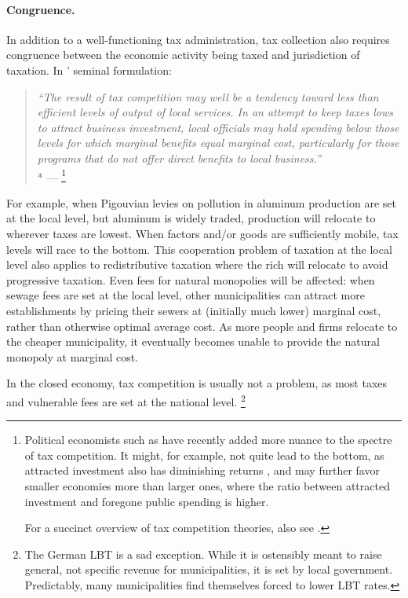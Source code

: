 \paragraph[Congruence]{Congruence.} In addition to a well-functioning tax administration, tax collection also requires congruence between the economic activity being taxed and jurisdiction of taxation.
In \citeauthor{Oates1972}' seminal formulation:
\begin{quote}
	\emph{``The result of tax competition may well be a tendency toward less than efficient levels of output of local services.
	In an attempt to keep taxes lows to attract business investment, local officials may hold spending below those levels for which marginal benefits equal marginal cost, particularly for those programs that do not offer direct benefits to local business.''}
	\\*
	--- \citet[143]{Oates1972}
	\footnote{
		Political economists such as \cite{Dehejia1999} have recently added more nuance to the spectre of tax competition.
		It might, for example, not quite lead to the bottom, as attracted investment also has diminishing returns \citeyearpar[416]{Dehejia1999}, and may further favor smaller economies more than larger ones, where the ratio between attracted investment and foregone public spending is higher.

		For a succinct overview of tax competition theories, also see \cite{Wilson1999}.
	}
\end{quote}
For example, when Pigouvian levies on pollution in aluminum production are set at the local level, but aluminum is widely traded, production will relocate to wherever taxes are lowest.
When factors and/or goods are sufficiently mobile, tax levels will race to the bottom.
This cooperation problem of taxation at the local level also applies to redistributive taxation where the rich will relocate to avoid progressive taxation.
Even fees for natural monopolies will be affected:
when sewage fees are set at the local level, other municipalities can attract more establishments by pricing their sewers at (initially much lower) marginal cost, rather than otherwise optimal average cost.
As more people and firms relocate to the cheaper municipality, it eventually becomes unable to provide the natural monopoly at marginal cost.

In the closed economy, tax competition is usually not a problem, as most taxes and vulnerable fees are set at the national level.
\footnote{
	The German \gls{LBT} is a sad exception.
	While it is ostensibly meant to raise general, not specific revenue for municipalities, it is set by local government.
	Predictably, many municipalities find themselves forced to lower \gls{LBT} rates.
}

